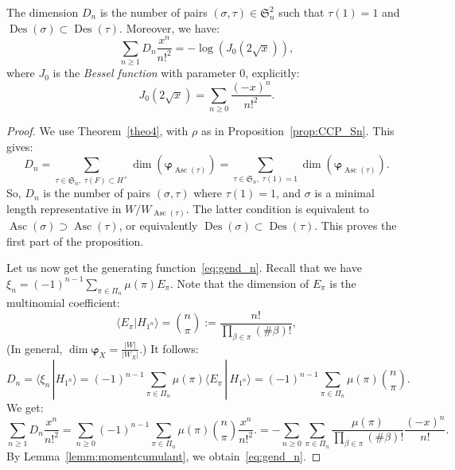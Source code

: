 \documentclass[10pt,a4paper]{amsart}
\DeclareMathOperator{\asc}{Asc}
\DeclareMathOperator{\des}{Des}
\newcommand{\bphi}{\boldsymbol{\varphi}}
\begin{document}
\begin{prop} \label{prop:Sn}
    The dimension $D_n$ is the number of pairs $(\sigma,\tau) \in \mathfrak{S}_n^2$ such that $\tau(1)=1$ and $\des(\sigma) \subset \des(\tau)$.
    Moreover, we have:
    \begin{equation} \label{eq:gend_n}
        \sum_{n\geq 1} D_n \frac{x^n}{n!^2} = -\log(J_0(2\sqrt{x})),
    \end{equation}
    where $J_0$ is the {\it Bessel function} with parameter $0$, explicitly:    
    \[
        J_0(2\sqrt{x}) = \sum_{n\geq 0} \frac{(-x)^n}{n!^2}.
    \]
\end{prop}

\begin{proof}
    We use Theorem~\ref{theo4}, with $\rho$ as in Proposition~\ref{prop:CCP_Sn}.  This gives:
    \[
        D_n
            =
        \sum_{\tau \in \mathfrak{S}_n,\; \tau(F) \subset H^+ } \dim( \bphi_{\asc(\tau)} )
            =
        \sum_{\tau \in \mathfrak{S}_n,\; \tau(1)=1} \dim( \bphi_{\asc(\tau)} ).
    \]
    So, $D_n$ is the number of pairs $(\sigma,\tau)$ where $\tau(1)=1$, and $\sigma$ is a minimal length representative in $W/ W_{\asc(\tau)}$.  The latter condition is equivalent to $\asc(\sigma) \supset \asc(\tau)$, or equivalently $\des(\sigma) \subset \des(\tau)$.  This proves the first part of the proposition.

    Let us now get the generating function~\eqref{eq:gend_n}.  Recall that we have $\xi_n = (-1)^{n-1} \sum_{\pi\in\Pi_n} \mu(\pi) E_\pi$.  Note that the dimension of $E_\pi$ is the multinomial coefficient:
    \[
        \langle E_\pi | H_{1^n} \rangle
            =
        \binom{n}{\pi} := \frac{n!}{\prod_{\beta\in\pi} (\#\beta) !} ,
    \]
    (In general, $\dim\bphi_X = \frac{|W|}{|W_X|}$.)   It follows:
    \[
        D_n = \langle \xi_n \,| H_{1^n} \rangle
        =
        (-1)^{n-1} \sum_{\pi\in\Pi_n} \mu(\pi) \langle E_\pi \,|\,  H_{1^n} \rangle
        =
        (-1)^{n-1}  \sum_{\pi\in\Pi_n} \mu(\pi) \binom{n}{\pi}.
    \]
    We get:
    \[
        \sum_{n\geq 1} D_n \frac{x^n}{n!^2}
            =
        \sum_{n\geq 0} (-1)^{n-1} \sum_{\pi\in\Pi_n} \mu(\pi) \binom{n}{\pi}\frac{x^n}{n!^2}.
            =
        - \sum_{n\geq 0} \sum_{\pi\in\Pi_n} \frac{\mu(\pi)}{\prod_{\beta\in\pi} (\#\beta)! } \frac{(-x)^n}{n!}.
    \]
    By Lemma~\ref{lemm:momentcumulant}, we obtain~\eqref{eq:gend_n}.
\end{proof}
\end{document}
